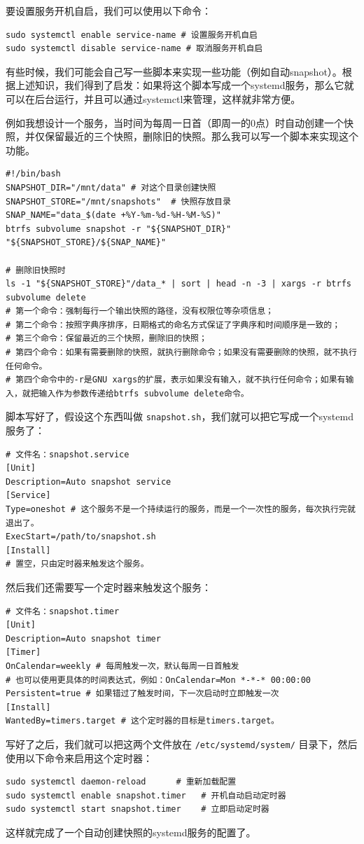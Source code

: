 要设置服务开机自启，我们可以使用以下命令：
\begin{verbatim}
sudo systemctl enable service-name # 设置服务开机自启
sudo systemctl disable service-name # 取消服务开机自启
\end{verbatim}

有些时候，我们可能会自己写一些脚本来实现一些功能（例如自动snapshot）。根据上述知识，我们得到了启发：如果将这个脚本写成一个systemd服务，那么它就可以在后台运行，并且可以通过systemctl来管理，这样就非常方便。

例如我想设计一个服务，当时间为每周一日首（即周一的0点）时自动创建一个快照，并仅保留最近的三个快照，删除旧的快照。那么我可以写一个脚本来实现这个功能。
\begin{verbatim}
#!/bin/bash
SNAPSHOT_DIR="/mnt/data" # 对这个目录创建快照
SNAPSHOT_STORE="/mnt/snapshots"  # 快照存放目录
SNAP_NAME="data_$(date +%Y-%m-%d-%H-%M-%S)"
btrfs subvolume snapshot -r "${SNAPSHOT_DIR}" "${SNAPSHOT_STORE}/${SNAP_NAME}"

# 删除旧快照时
ls -1 "${SNAPSHOT_STORE}"/data_* | sort | head -n -3 | xargs -r btrfs subvolume delete
# 第一个命令：强制每行一个输出快照的路径，没有权限位等杂项信息；
# 第二个命令：按照字典序排序，日期格式的命名方式保证了字典序和时间顺序是一致的；
# 第三个命令：保留最近的三个快照，删除旧的快照；
# 第四个命令：如果有需要删除的快照，就执行删除命令；如果没有需要删除的快照，就不执行任何命令。
# 第四个命令中的-r是GNU xargs的扩展，表示如果没有输入，就不执行任何命令；如果有输入，就把输入作为参数传递给btrfs subvolume delete命令。
\end{verbatim}

脚本写好了，假设这个东西叫做 \verb|snapshot.sh|，我们就可以把它写成一个systemd服务了：
\begin{verbatim}
# 文件名：snapshot.service
[Unit]
Description=Auto snapshot service
[Service]
Type=oneshot # 这个服务不是一个持续运行的服务，而是一个一次性的服务，每次执行完就退出了。
ExecStart=/path/to/snapshot.sh
[Install]
# 置空，只由定时器来触发这个服务。
\end{verbatim}
然后我们还需要写一个定时器来触发这个服务：
\begin{verbatim}
# 文件名：snapshot.timer
[Unit]
Description=Auto snapshot timer
[Timer]
OnCalendar=weekly # 每周触发一次，默认每周一日首触发
# 也可以使用更具体的时间表达式，例如：OnCalendar=Mon *-*-* 00:00:00
Persistent=true # 如果错过了触发时间，下一次启动时立即触发一次
[Install]
WantedBy=timers.target # 这个定时器的目标是timers.target。
\end{verbatim}
写好了之后，我们就可以把这两个文件放在 \texttt{/etc/systemd/system/} 目录下，然后使用以下命令来启用这个定时器：
\begin{verbatim}
sudo systemctl daemon-reload      # 重新加载配置
sudo systemctl enable snapshot.timer   # 开机自动启动定时器
sudo systemctl start snapshot.timer    # 立即启动定时器
\end{verbatim}
这样就完成了一个自动创建快照的systemd服务的配置了。

